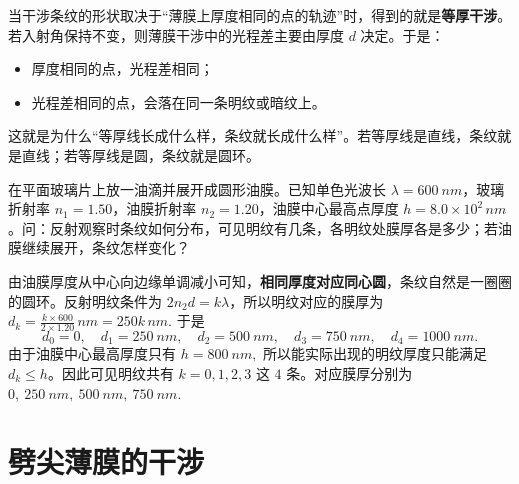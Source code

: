 \documentclass[lang=cn,11pt]{elegantbook}
\begin{document}
\begin{definition}[等厚干涉]
当干涉条纹的形状取决于“薄膜上厚度相同的点的轨迹”时，得到的就是\textbf{等厚干涉}。
若入射角保持不变，则薄膜干涉中的光程差主要由厚度 \(d\) 决定。于是：
\begin{itemize}
 \item 厚度相同的点，光程差相同；
 \item 光程差相同的点，会落在同一条明纹或暗纹上。
\end{itemize}
这就是为什么“等厚线长成什么样，条纹就长成什么样”。若等厚线是直线，条纹就是直线；若等厚线是圆，条纹就是圆环。
\end{definition}

\begin{exercise}[圆形油膜条纹为什么会一圈圈向中心数]
在平面玻璃片上放一油滴并展开成圆形油膜。已知单色光波长 \(\lambda=\SI{600}{nm}\)，玻璃折射率 \(n_1=1.50\)，油膜折射率 \(n_2=1.20\)，油膜中心最高点厚度 \(h=8.0\times10^2\,\si{nm}\)。问：反射观察时条纹如何分布，可见明纹有几条，各明纹处膜厚各是多少；若油膜继续展开，条纹怎样变化？
\end{exercise}

\begin{solution}
由油膜厚度从中心向边缘单调减小可知，\textbf{相同厚度对应同心圆}，条纹自然是一圈圈的圆环。反射明纹条件为 \(2n_2d=k\lambda\)，所以明纹对应的膜厚为
 \(d_k=\frac{k\times 600}{2\times1.20}\,\si{nm}=250k\,\si{nm}.\) 
于是
\[
d_0=0,\quad d_1=\SI{250}{nm},\quad d_2=\SI{500}{nm},\quad d_3=\SI{750}{nm},\quad d_4=\SI{1000}{nm}.
\]
由于油膜中心最高厚度只有
 \(h=\SI{800}{nm},\) 
所以能实际出现的明纹厚度只能满足 \(d_k\le h\)。因此可见明纹共有
 \(k=0,1,2,3\) 
这 \(4\) 条。对应膜厚分别为
 \(0,\ \SI{250}{nm},\ \SI{500}{nm},\ \SI{750}{nm}.\) 
\end{solution}

\section{劈尖薄膜的干涉}
\end{document}
